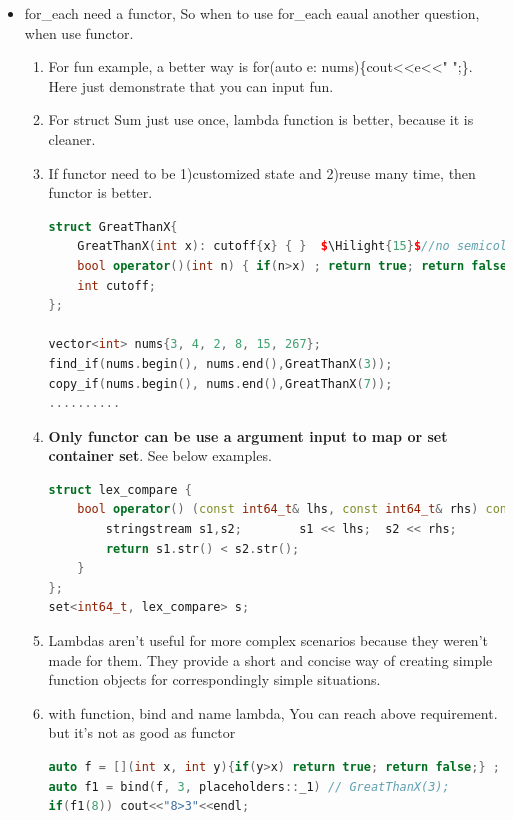 \documentclass[a4paper,11pt,twoside]{book}
\newcommand{\Hilight}[1]{\makebox[0pt][l]{\color{yellow}\rule[-3pt]{#1em}{11pt}}}
\newcommand{\Hilight}[1]{}
\begin{document}
\begin{itemize}
\item for\_each need a functor, So when to use for\_each eaual another question, when use functor.
\begin{enumerate}
\item For fun example, a better way is for(auto e: nums)\{cout<<e<<" ";\}. Here just demonstrate that  you can input fun.
\item For struct Sum just use once, lambda function is better, because it is cleaner.
\item If functor need to be 1)customized state and 2)reuse many time, then functor is better.
\begin{lstlisting}[frame=single, language=c++, mathescape=true]
struct GreatThanX{
    GreatThanX(int x): cutoff{x} { }  $\Hilight{15}$//no semicolon here
    bool operator()(int n) { if(n>x) ; return true; return false; }
    int cutoff;
};

vector<int> nums{3, 4, 2, 8, 15, 267};
find_if(nums.begin(), nums.end(),GreatThanX(3));
copy_if(nums.begin(), nums.end(),GreatThanX(7));
..........
\end{lstlisting}
\item \textbf{Only functor can be use a argument input to map or set container set}. See below examples.

\begin{lstlisting}[frame=single, language=c++, mathescape=true]
struct lex_compare {
    bool operator() (const int64_t& lhs, const int64_t& rhs) const{
        stringstream s1,s2;        s1 << lhs;  s2 << rhs;
        return s1.str() < s2.str();
    }
};
set<int64_t, lex_compare> s;
\end{lstlisting}


\item Lambdas aren't useful for more complex scenarios because they weren't made for them. They provide a short and concise way of creating simple function objects for correspondingly simple situations.

\item with function, bind and name lambda, You can reach above requirement.  but it's not as good as functor
\begin{lstlisting}[frame=single, language=c++, mathescape=true]
auto f = [](int x, int y){if(y>x) return true; return false;} ;
auto f1 = bind(f, 3, placeholders::_1) // GreatThanX(3);
if(f1(8)) cout<<"8>3"<<endl;
\end{lstlisting}

\end{enumerate}

\end{itemize}
\end{document}
